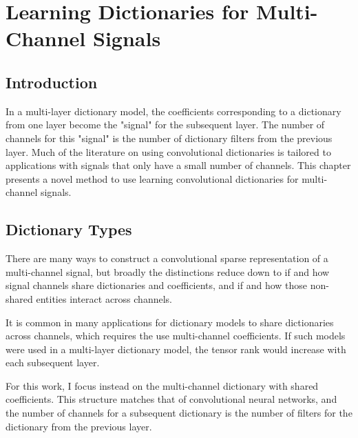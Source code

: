 \chapter{Learning Dictionaries for Multi-Channel Signals}

\section{Introduction}
In a multi-layer dictionary model, the coefficients corresponding to a dictionary from one layer become the "signal" for the subsequent layer.  The number of channels for this "signal" is the number of dictionary filters from the previous layer.  Much of the literature on using convolutional dictionaries is tailored to applications with signals that only have a small number of channels.  This chapter presents a novel method to use learning convolutional dictionaries for multi-channel signals. 
\section{Dictionary Types}
There are many ways to construct a convolutional sparse representation of a multi-channel signal, but broadly the distinctions reduce down to if and how signal channels share dictionaries and coefficients, and if and how those non-shared entities interact across channels.

It is common in many applications for dictionary models to share dictionaries across channels, which requires the use multi-channel coefficients. If such models were used in a multi-layer dictionary model, the tensor rank would increase with each subsequent layer.

For this work, I focus instead on the multi-channel dictionary with shared coefficients. This structure matches that of convolutional neural networks, and the number of channels for a subsequent dictionary is the number of filters for the dictionary from the previous layer.
